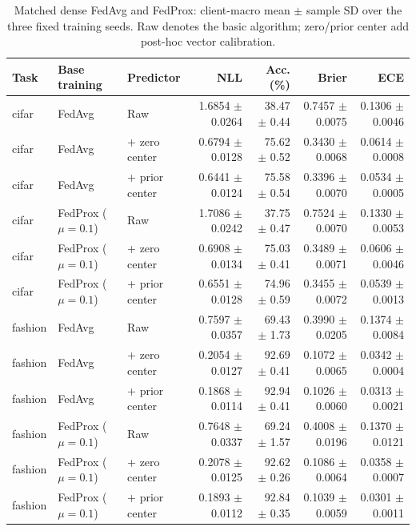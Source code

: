 \begin{table}[t]
\centering\scriptsize
\setlength{\tabcolsep}{3pt}
\caption{Matched dense FedAvg and FedProx: client-macro mean $\pm$ sample SD over the three fixed training seeds. Raw denotes the basic algorithm; zero/prior center add post-hoc vector calibration.}
\label{tab:dense_baselines_full}
\begin{tabular}{lllrrrr}
\toprule
Task & Base training & Predictor & NLL & Acc. (\%) & Brier & ECE \\
\midrule
cifar & FedAvg & Raw & 1.6854 $\pm$ 0.0264 & 38.47 $\pm$ 0.44 & 0.7457 $\pm$ 0.0075 & 0.1306 $\pm$ 0.0046 \\
cifar & FedAvg & + zero center & 0.6794 $\pm$ 0.0128 & 75.62 $\pm$ 0.52 & 0.3430 $\pm$ 0.0068 & 0.0614 $\pm$ 0.0008 \\
cifar & FedAvg & + prior center & 0.6441 $\pm$ 0.0124 & 75.58 $\pm$ 0.54 & 0.3396 $\pm$ 0.0070 & 0.0534 $\pm$ 0.0005 \\
cifar & FedProx ($\mu=0.1$) & Raw & 1.7086 $\pm$ 0.0242 & 37.75 $\pm$ 0.47 & 0.7524 $\pm$ 0.0070 & 0.1330 $\pm$ 0.0053 \\
cifar & FedProx ($\mu=0.1$) & + zero center & 0.6908 $\pm$ 0.0134 & 75.03 $\pm$ 0.41 & 0.3489 $\pm$ 0.0071 & 0.0606 $\pm$ 0.0046 \\
cifar & FedProx ($\mu=0.1$) & + prior center & 0.6551 $\pm$ 0.0128 & 74.96 $\pm$ 0.59 & 0.3455 $\pm$ 0.0072 & 0.0539 $\pm$ 0.0013 \\
fashion & FedAvg & Raw & 0.7597 $\pm$ 0.0357 & 69.43 $\pm$ 1.73 & 0.3990 $\pm$ 0.0205 & 0.1374 $\pm$ 0.0084 \\
fashion & FedAvg & + zero center & 0.2054 $\pm$ 0.0127 & 92.69 $\pm$ 0.41 & 0.1072 $\pm$ 0.0065 & 0.0342 $\pm$ 0.0004 \\
fashion & FedAvg & + prior center & 0.1868 $\pm$ 0.0114 & 92.94 $\pm$ 0.41 & 0.1026 $\pm$ 0.0060 & 0.0313 $\pm$ 0.0021 \\
fashion & FedProx ($\mu=0.1$) & Raw & 0.7648 $\pm$ 0.0337 & 69.24 $\pm$ 1.57 & 0.4008 $\pm$ 0.0196 & 0.1370 $\pm$ 0.0121 \\
fashion & FedProx ($\mu=0.1$) & + zero center & 0.2078 $\pm$ 0.0125 & 92.62 $\pm$ 0.26 & 0.1086 $\pm$ 0.0064 & 0.0358 $\pm$ 0.0007 \\
fashion & FedProx ($\mu=0.1$) & + prior center & 0.1893 $\pm$ 0.0112 & 92.84 $\pm$ 0.35 & 0.1039 $\pm$ 0.0059 & 0.0301 $\pm$ 0.0011 \\
\bottomrule
\end{tabular}
\end{table}
